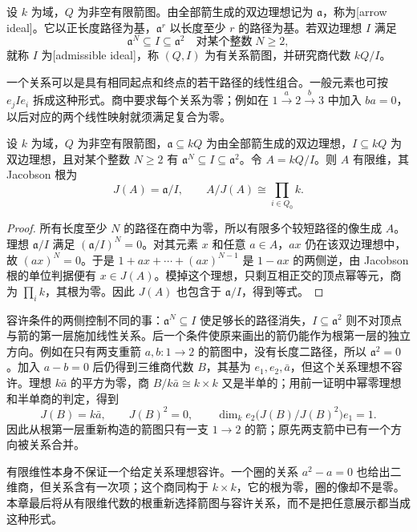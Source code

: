 \begin{definition}\label{b5:def:admissible-quiver-relations}
	设 \(k\) 为域，\(Q\) 为非空有限箭图。由全部箭生成的双边理想记为 \(\mathfrak a\)，称为[arrow ideal]。它以正长度路径为基，\(\mathfrak a^r\) 以长度至少 \(r\) 的路径为基。若双边理想 \(I\) 满足
	\[
		\mathfrak a^N\subseteq I\subseteq\mathfrak a^2 \quad\text{对某个整数}\;N\ge2,
	\]
	就称 \(I\) 为[admissible ideal]，称 \((Q,I)\) 为有关系箭图，并研究商代数 \(kQ/I\)。
\end{definition}
一个关系可以是具有相同起点和终点的若干路径的线性组合。一般元素也可按 \(e_j I e_i\) 拆成这种形式。商中要求每个关系为零；例如在 \(1\xrightarrow{a}2\xrightarrow{b}3\) 中加入 \(ba=0\)，以后对应的两个线性映射就须满足复合为零。
\begin{proposition}\label{b5:prop:bound-quiver-radical}
	设 \(k\) 为域，\(Q\) 为非空有限箭图，\(\mathfrak a\subseteq kQ\) 为由全部箭生成的双边理想，\(I\subseteq kQ\) 为双边理想，且对某个整数 \(N\ge2\) 有 \(\mathfrak a^N\subseteq I\subseteq\mathfrak a^2\)。令 \(A=kQ/I\)。则 \(A\) 有限维，其 Jacobson 根为
	\[
		J(A)=\mathfrak a/I,\qquad A/J(A)\cong\prod_{i\in Q_0}k.
	\]
\end{proposition}
\begin{proof}
	所有长度至少 \(N\) 的路径在商中为零，所以有限多个较短路径的像生成 \(A\)。理想 \(\mathfrak a/I\) 满足 \((\mathfrak a/I)^N=0\)。对其元素 \(x\) 和任意 \(a\in A\)，\(ax\) 仍在该双边理想中，故 \((ax)^N=0\)。于是 \(1+ax+\cdots+(ax)^{N-1}\) 是 \(1-ax\) 的两侧逆，由 Jacobson 根的单位判据便有 \(x\in J(A)\)。模掉这个理想，只剩互相正交的顶点幂等元，商为 \(\prod_i k\)，其根为零。因此 \(J(A)\) 也包含于 \(\mathfrak a/I\)，得到等式。
\end{proof}
容许条件的两侧控制不同的事：\(\mathfrak a^N\subseteq I\) 使足够长的路径消失，\(I\subseteq\mathfrak a^2\) 则不对顶点与箭的第一层施加线性关系。后一个条件使原来画出的箭仍能作为根第一层的独立方向。例如在只有两支重箭 \(a,b:1\to2\) 的箭图中，没有长度二路径，所以 \(\mathfrak a^2=0\)。加入 \(a-b=0\) 后仍得到三维商代数 \(B\)，其基为 \(e_1,e_2,\bar a\)，但这个关系理想不容许。理想 \(k\bar a\) 的平方为零，商 \(B/k\bar a\cong k\times k\) 又是半单的；用前一证明中幂零理想和半单商的判定，得到
\[
	J(B)=k\bar a,\qquad J(B)^2=0,\qquad \dim_k e_2\bigl(J(B)/J(B)^2\bigr)e_1=1.
\]
因此从根第一层重新构造的箭图只有一支 \(1\to2\) 的箭；原先两支箭中已有一个方向被关系合并。

\ProseParagraphBreak

有限维性本身不保证一个给定关系理想容许。一个圈的关系 \(a^2-a=0\) 也给出二维商，但关系含有一次项；这个商同构于 \(k\times k\)，它的根为零，圈的像却不是零。本章最后将从有限维代数的根重新选择箭图与容许关系，而不是把任意展示都当成这种形式。

